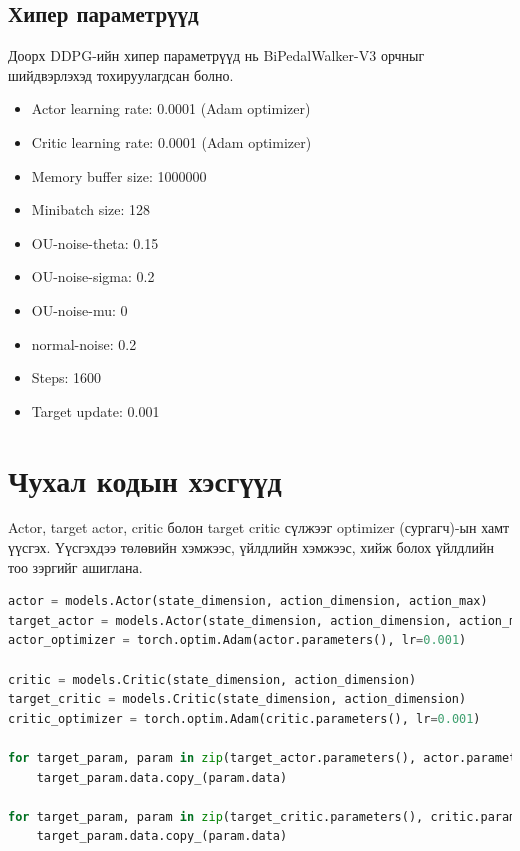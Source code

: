 \documentclass[12pt,A4]{report}
\begin{document}
\subsection{Хипер параметрүүд}

Доорх DDPG-ийн хипер параметрүүд нь BiPedalWalker-V3 орчныг шийдвэрлэхэд тохируулагдсан болно.

\begin{itemize}
	\item Actor learning rate: 0.0001 (Adam optimizer)
	\item Critic learning rate: 0.0001 (Adam optimizer)
	\item Memory buffer size: 1000000
	\item Minibatch size: 128
	\item OU-noise-theta: 0.15
	\item OU-noise-sigma: 0.2
	\item OU-noise-mu: 0
	\item normal-noise: 0.2
	\item Steps: 1600
	\item Target update: 0.001
\end{itemize}

\section{Чухал кодын хэсгүүд}

Actor, target actor, critic болон target critic сүлжээг optimizer (сургагч)-ын хамт үүсгэх. Үүсгэхдээ төлөвийн хэмжээс, үйлдлийн хэмжээс, хийж болох үйлдлийн тоо зэргийг ашиглана.

\begin{lstlisting}[language=Python, caption=Actor critic сүлжээ үүсгэх, frame=single]
actor = models.Actor(state_dimension, action_dimension, action_max)
target_actor = models.Actor(state_dimension, action_dimension, action_max)
actor_optimizer = torch.optim.Adam(actor.parameters(), lr=0.001)

critic = models.Critic(state_dimension, action_dimension)
target_critic = models.Critic(state_dimension, action_dimension)
critic_optimizer = torch.optim.Adam(critic.parameters(), lr=0.001)

for target_param, param in zip(target_actor.parameters(), actor.parameters()):
	target_param.data.copy_(param.data)

for target_param, param in zip(target_critic.parameters(), critic.parameters()):
    target_param.data.copy_(param.data)
\end{lstlisting}
\end{document}
